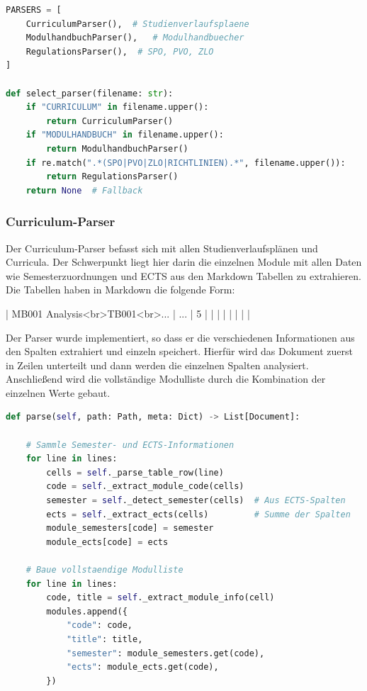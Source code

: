 \begin{lstlisting}[language=Python, caption={Parser Auswahl}]
PARSERS = [
    CurriculumParser(),  # Studienverlaufsplaene
    ModulhandbuchParser(),   # Modulhandbuecher  
    RegulationsParser(),  # SPO, PVO, ZLO
]

def select_parser(filename: str):
    if "CURRICULUM" in filename.upper():
        return CurriculumParser()
    if "MODULHANDBUCH" in filename.upper():
        return ModulhandbuchParser()
    if re.match(".*(SPO|PVO|ZLO|RICHTLINIEN).*", filename.upper()):
        return RegulationsParser()
    return None  # Fallback
\end{lstlisting}

\subsubsection{Curriculum-Parser}
Der Curriculum-Parser befasst sich mit allen Studienverlaufsplänen und Curricula. Der Schwerpunkt liegt hier darin die einzelnen Module mit allen Daten wie Semesterzuordnungen und ECTS aus den Markdown Tabellen zu extrahieren. Die Tabellen haben in Markdown die folgende Form:

| MB001 Analysis<br>TB001<br>... | ... | 5 | | | | | | | |

Der Parser wurde implementiert, so dass er die verschiedenen Informationen aus den Spalten extrahiert und einzeln speichert. Hierfür wird das Dokument zuerst in Zeilen unterteilt und dann werden die einzelnen Spalten analysiert. Anschließend wird die vollständige Modulliste durch die Kombination der einzelnen Werte gebaut.
\begin{lstlisting}[language=Python, caption={Regulatinsparser-Implementierung}]
def parse(self, path: Path, meta: Dict) -> List[Document]:

    # Sammle Semester- und ECTS-Informationen
    for line in lines:
        cells = self._parse_table_row(line)
        code = self._extract_module_code(cells)
        semester = self._detect_semester(cells)  # Aus ECTS-Spalten
        ects = self._extract_ects(cells)         # Summe der Spalten
        module_semesters[code] = semester
        module_ects[code] = ects
    
    # Baue vollstaendige Modulliste
    for line in lines:
        code, title = self._extract_module_info(cell)
        modules.append({
            "code": code,
            "title": title,
            "semester": module_semesters.get(code),
            "ects": module_ects.get(code),
        })
\end{lstlisting}

